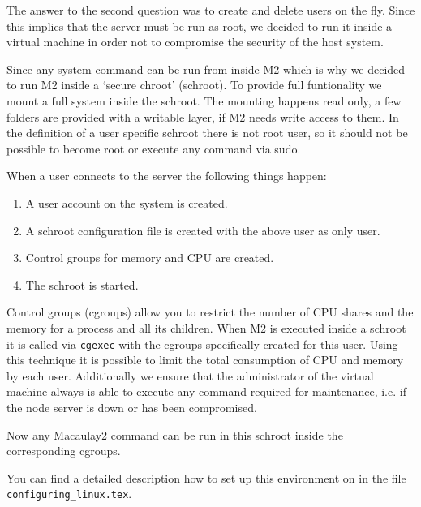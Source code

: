 \documentclass[]{article}
\begin{document}
The answer to the second question was to create and delete users on the fly. Since this implies that the server must be run as root, we decided to run it inside a virtual machine in order not to compromise the security of the host system.


Since any system command can be run from inside M2 which is why we decided to run M2 inside a `secure chroot' (schroot). To provide full funtionality we mount a full system inside the schroot. The mounting happens read only, a few folders are provided with a writable layer, if M2 needs write access to them. In the definition of a user specific schroot there is not root user, so it should not be possible to become root or execute any command via sudo.

When a user connects to the server the following things happen:
\begin{enumerate}
\item A user account on the system is created.
\item A schroot configuration file is created with the above user as only user.
\item Control groups for memory and CPU are created.
\item The schroot is started.
\end{enumerate}

Control groups (cgroups) allow you to restrict the number of CPU shares and the memory for a process and all its children. When M2 is executed inside a schroot it is called via {\tt cgexec} with the cgroups specifically created for this user. Using this technique it is possible to limit the total consumption of CPU and memory by each user. Additionally we ensure that the administrator of the virtual machine always is able to execute any command required for maintenance, i.e. if the node server is down or has been compromised.

Now any Macaulay2 command can be run in this schroot inside the corresponding cgroups.

You can find a detailed description how to set up this environment on \cite{trym2-github} in the file {\tt configuring\_linux.tex}.



\end{document}
